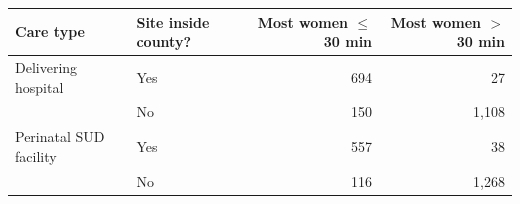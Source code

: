 \begin{tabular}{@{}llrr@{}}
\toprule
Care type & Site inside county? & Most women $\le$30 min & Most women $>$30 min \\
\midrule
Delivering hospital & Yes & 694 & 27 \\
 & No & 150 & 1{,}108 \\
Perinatal SUD facility & Yes & 557 & 38 \\
 & No & 116 & 1{,}268 \\
\bottomrule
\end{tabular}
